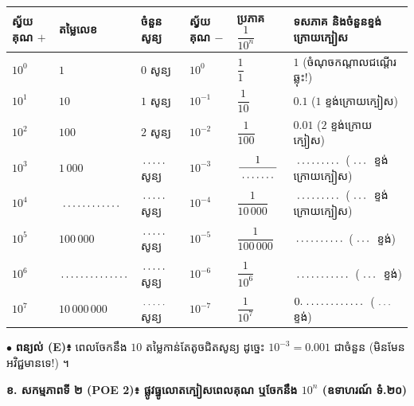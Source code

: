 \documentclass[a4paper,10pt]{article}
\newcommand{\en}[1]{{\TimesEn #1}}
\newcommand{\blank}[1][1.5cm]{\makebox[#1]{\dotfill}}
\begin{document}
{\renewcommand{\arraystretch}{1.34}
\begin{tabular}{|C{1.90cm}|C{3.35cm}|C{2.45cm}||C{2.00cm}|C{3.25cm}|C{4.65cm}|}
  \hline
  \textbf{ស្វ័យគុណ $+$} & \textbf{តម្លៃលេខ} & \textbf{ចំនួនសូន្យ} & \textbf{ស្វ័យគុណ $-$} & \textbf{ប្រភាគ $\dfrac{1}{10^n}$} & \textbf{ទសភាគ និងចំនួនខ្ទង់ក្រោយក្បៀស} \\
  \hline
  $10^0$ & $1$ & $0$ សូន្យ & $10^0$ & $\dfrac{1}{1}$ & $1$ (ចំណុចកណ្ដាលជណ្ដើរឆ្លុះ!) \\
  \hline
  $10^1$ & $10$ & $1$ សូន្យ & $10^{-1}$ & $\dfrac{1}{10}$ & $0.1$ ($1$ ខ្ទង់ក្រោយក្បៀស) \\
  \hline
  $10^2$ & $100$ & $2$ សូន្យ & $10^{-2}$ & $\dfrac{1}{100}$ & $0.01$ ($2$ ខ្ទង់ក្រោយក្បៀស) \\
  \hline
  $10^3$ & $1\,000$ & $\blank[0.8cm]$ សូន្យ & $10^{-3}$ & $\dfrac{1}{\blank[1.2cm]}$ & $\blank[1.5cm]$ ($\blank[0.6cm]$ ខ្ទង់ក្រោយក្បៀស) \\
  \hline
  $10^4$ & $\blank[2.0cm]$ & $\blank[0.8cm]$ សូន្យ & $10^{-4}$ & $\dfrac{1}{10\,000}$ & $\blank[1.5cm]$ ($\blank[0.6cm]$ ខ្ទង់ក្រោយក្បៀស) \\
  \hline
  $10^5$ & $100\,000$ & $\blank[0.8cm]$ សូន្យ & $10^{-5}$ & $\dfrac{1}{100\,000}$ & $\blank[1.6cm]$ ($\blank[0.6cm]$ ខ្ទង់) \\
  \hline
  $10^6$ & $\blank[2.2cm]$ & $\blank[0.8cm]$ សូន្យ & $10^{-6}$ & $\dfrac{1}{10^6}$ & $\blank[1.8cm]$ ($\blank[0.6cm]$ ខ្ទង់) \\
  \hline
  $10^7$ & $10\,000\,000$ & $\blank[0.8cm]$ សូន្យ & $10^{-7}$ & $\dfrac{1}{10^7}$ & $0.\blank[2.0cm]$ ($\blank[0.6cm]$ ខ្ទង់) \\
  \hline
\end{tabular}}

\vspace{3pt}
$\bullet$ \textbf{ពន្យល់ (\en{E})៖} ពេលចែកនឹង $10$ តម្លៃកាន់តែតូចជិតសូន្យ ដូច្នេះ $10^{-3} = 0.001$ ជាចំនួន\blank[2.0cm] (មិនមែនអវិជ្ជមានទេ!) ។

\vspace{4pt}
\textbf{ខ. សកម្មភាពទី ២ (\en{POE 2})៖ ផ្លូវធ្នូលោតក្បៀសពេលគុណ ឬចែកនឹង $10^n$ (ឧទាហរណ៍ ទំ.២០)}
\end{document}
